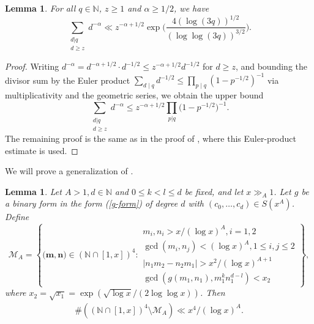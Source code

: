 \documentclass[reqno, 11pt]{amsart}
\renewcommand{\leq}{\leqslant}
\renewcommand{\geq}{\geqslant}
\newtheorem{lemma}[theorem]{Lemma}
\theoremstyle{definition}
\theoremstyle{definition}
\renewcommand{\geq}{\geqslant}
\renewcommand{\leq}{\leqslant}
\newcommand{\mm}{\mathbf{m}}
\newcommand{\nn}{\mathbf{n}}
\newcommand{\NN}{\mathbb{N}}
\numberwithin{equation}{section}
\begin{document}
\begin{lemma}\label{Lemma-1.4}
   For all $q \in \NN$, $z \geq 1$ and $\alpha \geq 1/2$, we have
   $$\sum_{\substack{d | q \\ d \geq z}} d^{-\alpha} \ll z^{-\alpha+1/2} \exp \Big( \frac{4 (\log(3q))^{1/2}}{(\log \log (3q))^{3/2}} \Big).$$
\end{lemma}
\begin{proof}
   Writing $d^{-\alpha} = d^{-\alpha + 1/2} \cdot d^{-1/2} \leq z^{-\alpha + 1/2} d^{-1/2}$ for $d \geq z$, and bounding the divisor sum by the Euler product $\sum_{d \mid q} d^{-1/2} \leq \prod_{p \mid q}(1 - p^{-1/2})^{-1}$ via multiplicativity and the geometric series, we obtain the upper bound
   $$\sum_{\substack{d|q \\ d \geq z}} d^{-\alpha} \leq z^{-\alpha+1/2} \prod_{p | q} \Big( 1 - p^{-1/2} \Big)^{-1}.$$
   The remaining proof is the same as in the proof of \cite[Lemma 2.5]{BST}, where this Euler-product estimate is used.
\end{proof}

We will prove a generalization of \cite[Lemma 2.7]{BST}.
\begin{lemma}\label{Lemma-1.5}
	Let $A > 1, d \in \NN$ and $0 \leq k < l \leq d$ be fixed, and let $x \gg_A 1$. Let $g$ be a binary form in the form (\ref{g-form}) of degree $d$ with $(c_0,\dots,c_d)\in S(x^A)$. Define
\begin{equation}\label{eq:define_M}
\mathcal{M}_A=\left\{\mathbf (\mm, \nn) \in (\NN \cap [1,x])^4: 
\begin{array}{l}
m_i, n_i > x / (\log x)^{A}, i = 1,2 \\
\gcd(m_i, n_j) < (\log x)^{A}, 1 \leq i,j \leq 2 \\
|n_1m_2 - n_2m_1| > x^2/ (\log x)^{A+1} \\
\gcd(g(m_1,n_1), m_1^k n_1^{d-l}) < x_2
\end{array}
\right\},
\end{equation}
where $x_2 = \sqrt{x_1} = \exp(\sqrt{\log x}/ (2\log \log x ))$. Then 
\begin{eqnarray*}
	\#((\NN \cap [1,x])^4 \setminus \mathcal{M}_A) \ll x^4 / (\log x)^A.  
\end{eqnarray*}
\end{lemma}
\end{document}
